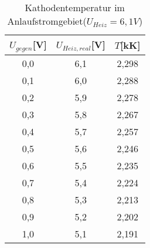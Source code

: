 \begin{table}[h]
	\begin{center}
		\begin{tabular}{ccc}
			$U_{gegen}$[V]&$U_{Heiz,real}$[V]&$T$[kK] \\ \hline
			0,0&6,1&2,298\\
			0,1&6,0&2,288\\
			0,2&5,9&2,278\\
			0,3&5,8&2,267\\
			0,4&5,7&2,257\\
			0,5&5,6&2,246\\
			0,6&5,5&2,235\\
			0,7&5,4&2,224\\
			0,8&5,3&2,213\\
			0,9&5,2&2,202\\
			1,0&5,1&2,191
		\end{tabular}
		\caption{Kathodentemperatur im Anlaufstromgebiet($U_{Heiz}=6,1V$)}
		\label{tabc1}
	\end{center}
\end{table}